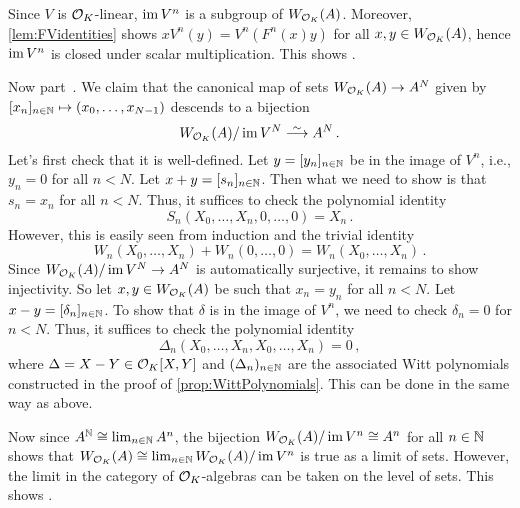 \documentclass[a4paper, 10pt, oneside, DIV=9, chapterprefix=true, numbers=enddot,bibliography=totoc]{scrbook}
\begin{document}
\begin{proof*}
	Since $V$ is $\mathcal{O}_K$-linear, $\operatorname{im} V^n$ is a subgroup of $W_{\mathcal{O}_K}(A)$. Moreover, \cref{lem:FVidentities} shows $xV^n(y)=V^n(F^n(x)y)$ for all $x,y\in W_{\mathcal{O}_K}(A)$, hence $\operatorname{im} V^n$ is closed under scalar multiplication. This shows .
	
	Now part~. We claim that the canonical map of sets $W_{\Oo_K}(A)\morphism A^N$ given by $[x_n]_{n\in\mathbb{N}}\mapsto (x_0,\dotsc,x_{N-1})$ descends to a bijection
	\begin{equation*}
		W_{\Oo_K}(A)/\im V^N\isomorphism A^N\,.
	\end{equation*}
	Let's first check that it is well-defined. Let $y=[y_n]_{n\in \mathbb{N}}$ be in the image of $V^n$, i.e., $y_n=0$ for all $n< N$. Let $x+y=[s_n]_{n\in \mathbb{N}}$. Then what we need to show is that $s_n=x_n$ for all $n<N$. Thus, it suffices to check the polynomial identity
	\begin{equation*}
		S_n(X_0,\dotsc,X_n,0,\dotsc,0)=X_n\,.
	\end{equation*}
	However, this is easily seen from induction and the trivial identity
	\begin{equation*}
		W_n(X_0,\dotsc,X_n)+W_n(0,\dotsc,0)=W_n(X_0,\dotsc,X_n)\,.
	\end{equation*}
	Since $W_{\Oo_K}(A)/\im V^N\morphism A^N$ is automatically surjective, it remains to show injectivity. So let $x,y\in W_{\mathcal{O}_K}(A)$ be such that $x_n=y_n$ for all $n<N$. Let $x-y=[\delta_n]_{n\in\mathbb{N}}$. To show that $\delta$ is in the image of $V^n$, we need to check $\delta_n=0$ for $n<N$. Thus, it suffices to check the polynomial identity
	\begin{equation*}
		\Delta_n(X_0,\dotsc,X_n,X_0,\dotsc,X_n)=0\,,
	\end{equation*}
	where $\Delta=X-Y\in\mathcal{O}_K[X,Y]$ and $(\Delta_n)_{n\in\mathbb{N}}$ are the associated Witt polynomials constructed in the proof of \cref{prop:WittPolynomials}. This can be done in the same way as above.
	
	Now since $A^{\mathbb{N}}\cong \lim_{n\in\mathbb{N}}A^n$, the bijection $W_{\mathcal{O}_K}(A)/\operatorname{im} V^n\cong A^n$ for all $n\in \mathbb{N}$ shows that $W_{\mathcal{O}_K}(A)\cong \lim_{n\in\mathbb{N}}W_{\mathcal{O}_K}(A)/\operatorname{im} V^n$ is true as a limit of sets. However, the limit in the category of $\mathcal{O}_K$-algebras can be taken on the level of sets. This shows .
	

\end{proof*}
\end{document}
